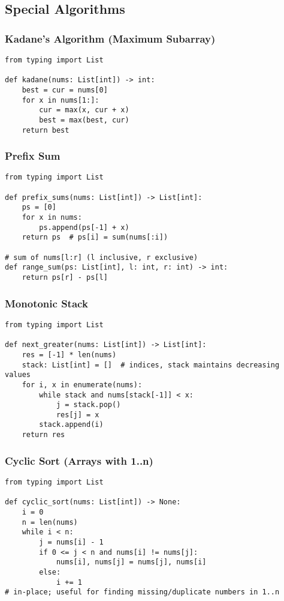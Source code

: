 \documentclass[11pt]{article}
\begin{document}
\subsection{Special Algorithms}
\subsubsection*{Kadane's Algorithm (Maximum Subarray)}
\begin{lstlisting}[style=py,caption={Kadane in O(n)}]
from typing import List

def kadane(nums: List[int]) -> int:
    best = cur = nums[0]
    for x in nums[1:]:
        cur = max(x, cur + x)
        best = max(best, cur)
    return best
\end{lstlisting}

\subsubsection*{Prefix Sum}
\begin{lstlisting}[style=py,caption={Prefix sums and range queries}]
from typing import List

def prefix_sums(nums: List[int]) -> List[int]:
    ps = [0]
    for x in nums:
        ps.append(ps[-1] + x)
    return ps  # ps[i] = sum(nums[:i])

# sum of nums[l:r] (l inclusive, r exclusive)
def range_sum(ps: List[int], l: int, r: int) -> int:
    return ps[r] - ps[l]
\end{lstlisting}

\subsubsection*{Monotonic Stack}
\begin{lstlisting}[style=py,caption={Next greater element (increasing stack)}]
from typing import List

def next_greater(nums: List[int]) -> List[int]:
    res = [-1] * len(nums)
    stack: List[int] = []  # indices, stack maintains decreasing values
    for i, x in enumerate(nums):
        while stack and nums[stack[-1]] < x:
            j = stack.pop()
            res[j] = x
        stack.append(i)
    return res
\end{lstlisting}

\subsubsection*{Cyclic Sort (Arrays with 1..n)}
\begin{lstlisting}[style=py,caption={Place numbers at correct indices}]
from typing import List

def cyclic_sort(nums: List[int]) -> None:
    i = 0
    n = len(nums)
    while i < n:
        j = nums[i] - 1
        if 0 <= j < n and nums[i] != nums[j]:
            nums[i], nums[j] = nums[j], nums[i]
        else:
            i += 1
# in-place; useful for finding missing/duplicate numbers in 1..n
\end{lstlisting}
\end{document}
